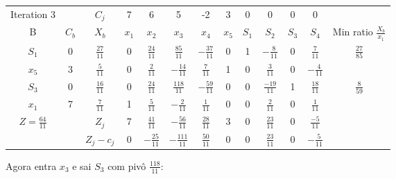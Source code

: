 \documentclass[11pt]{article}
\begin{document}
\begin{center}
\begin{tabular}{c c c c c c c c c c c c c}
Iteration 3 &  & \(C_j\) & 7 & 6 & 5 & -2 & 3 & 0 & 0 & 0 & 0 & \\
B & \(C_b\) & \(X_b\) & \(x_1\) & \(x_2\) & \(x_3\) & \(x_4\) & \(x_5\) & \(S_1\) & \(S_2\) & \(S_3\) & \(S_4\) & Min ratio \(\frac{X_b}{x_1}\)\\
\(S_1\) & 0 & \(\frac{27}{11}\) & 0 & \(\frac{24}{11}\) & \(\frac{85}{11}\) & \(-\frac{37}{11}\) & 0 & 1 & \(-\frac{8}{11}\) & 0 & \(\frac{7}{11}\) & \(\frac{27}{85}\)\\
\(x_5\) & 3 & \(\frac{5}{11}\) & 0 & \(\frac{2}{11}\) & \(-\frac{14}{11}\) & \(\frac{7}{11}\) & 1 & 0 & \(\frac{3}{11}\) & 0 & \(-\frac{4}{11}\) & \\
\(S_3\) & 0 & \(\frac{16}{11}\) & 0 & \(\frac{24}{11}\) & \(\frac{118}{11}\) & \(-\frac{59}{11}\) & 0 & 0 & \(\frac{-19}{11}\) & 1 & \(\frac{18}{11}\) & \(\frac{8}{59}\)\\
\(x_1\) & 7 & \(\frac{7}{11}\) & 1 & \(\frac{5}{11}\) & \(-\frac{2}{11}\) & \(\frac{1}{11}\) & 0 & 0 & \(\frac{2}{11}\) & 0 & \(\frac{1}{11}\) & \\
\(Z=\frac{64}{11}\) &  & \(Z_j\) & 7 & \(\frac{41}{11}\) & \(-\frac{56}{11}\) & \(\frac{28}{11}\) & 3 & 0 & \(\frac{23}{11}\) & 0 & \(\frac{-5}{11}\) & \\
 &  & \(Z_j-c_j\) & 0 & \(-\frac{25}{11}\) & \(-\frac{111}{11}\) & \(\frac{50}{11}\) & 0 & 0 & \(\frac{23}{11}\) & 0 & \(-\frac{5}{11}\) & \\
\end{tabular}
\end{center}

Agora entra \(x_3\) e sai \(S_3\) com pivô \(\frac{118}{11}\):
\end{document}
